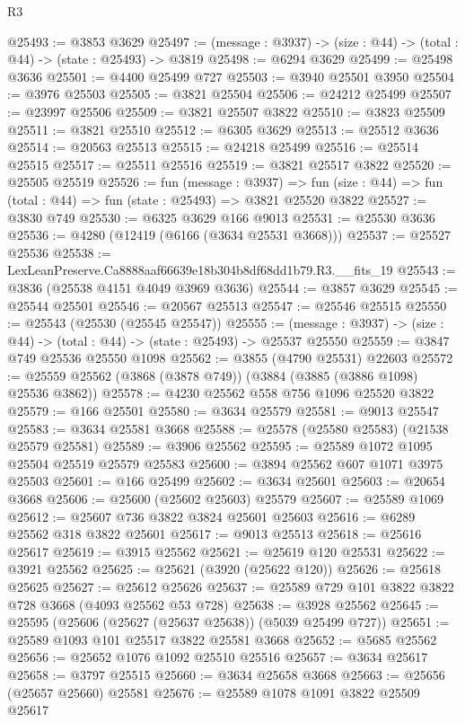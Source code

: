 \begin{lexlean}{R3}
\begin{coremodule}
@25493 := @3853 @3629
@25497 := (message : @3937) -> (size : @44) -> (total : @44) -> (state : @25493) -> @3819
@25498 := @6294 @3629
@25499 := @25498 @3636
@25501 := @4400 @25499 @727
@25503 := @3940 @25501 @3950
@25504 := @3976 @25503
@25505 := @3821 @25504
@25506 := @24212 @25499
@25507 := @23997 @25506
@25509 := @3821 @25507 @3822
@25510 := @3823 @25509
@25511 := @3821 @25510
@25512 := @6305 @3629
@25513 := @25512 @3636
@25514 := @20563 @25513
@25515 := @24218 @25499
@25516 := @25514 @25515
@25517 := @25511 @25516
@25519 := @3821 @25517 @3822
@25520 := @25505 @25519
@25526 := fun (message : @3937) =>
  fun (size : @44) => fun (total : @44) => fun (state : @25493) => @3821 @25520 @3822
@25527 := @3830 @749
@25530 := @6325 @3629 @166 @9013
@25531 := @25530 @3636
@25536 := @4280 (@12419 (@6166 (@3634 @25531 @3668)))
@25537 := @25527 @25536
@25538 := LexLeanPreserve.Ca8888aaf66639e18b304b8df68dd1b79.R3.__fits_19
@25543 := @3836 (@25538 @4151 @4049 @3969 @3636)
@25544 := @3857 @3629
@25545 := @25544 @25501
@25546 := @20567 @25513
@25547 := @25546 @25515
@25550 := @25543 (@25530 (@25545 @25547))
@25555 := (message : @3937) -> (size : @44) -> (total : @44) -> (state : @25493) -> @25537 @25550
@25559 := @3847 @749 @25536 @25550 @1098
@25562 := @3855 (@4790 @25531) @22603
@25572 := @25559 @25562 (@3868 (@3878 @749)) (@3884 (@3885 (@3886 @1098) @25536 @3862))
@25578 := @4230 @25562 @558 @756 @1096 @25520 @3822
@25579 := @166 @25501
@25580 := @3634 @25579
@25581 := @9013 @25547
@25583 := @3634 @25581 @3668
@25588 := @25578 (@25580 @25583) (@21538 @25579 @25581)
@25589 := @3906 @25562
@25595 := @25589 @1072 @1095 @25504 @25519 @25579 @25583
@25600 := @3894 @25562 @607 @1071 @3975 @25503
@25601 := @166 @25499
@25602 := @3634 @25601
@25603 := @20654 @3668
@25606 := @25600 (@25602 @25603) @25579
@25607 := @25589 @1069
@25612 := @25607 @736 @3822 @3824 @25601 @25603
@25616 := @6289 @25562 @318 @3822 @25601
@25617 := @9013 @25513
@25618 := @25616 @25617
@25619 := @3915 @25562
@25621 := @25619 @120 @25531
@25622 := @3921 @25562
@25625 := @25621 (@3920 (@25622 @120))
@25626 := @25618 @25625
@25627 := @25612 @25626
@25637 := @25589 @729 @101 @3822 @3822 @728 @3668 (@4093 @25562 @53 @728)
@25638 := @3928 @25562
@25645 := @25595 (@25606 (@25627 (@25637 @25638)) (@5039 @25499 @727))
@25651 := @25589 @1093 @101 @25517 @3822 @25581 @3668
@25652 := @5685 @25562
@25656 := @25652 @1076 @1092 @25510 @25516
@25657 := @3634 @25617
@25658 := @3797 @25515
@25660 := @3634 @25658 @3668
@25663 := @25656 (@25657 @25660) @25581
@25676 := @25589
    @1078
    @1091
    @3822
    @25509
    @25617

\end{coremodule}
\end{lexlean}
